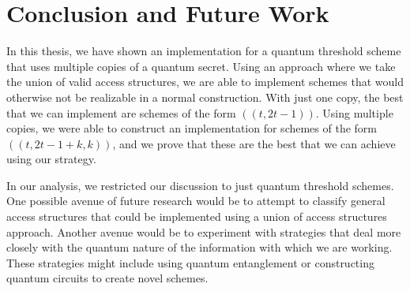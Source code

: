 \chapter{Conclusion and Future Work}
\label{conclusion}

In this thesis, we have shown an implementation for a quantum threshold scheme that uses multiple copies of a quantum secret. Using an approach where we take the union of valid access structures, we are able to implement schemes that would otherwise not be realizable in a normal construction. With just one copy, the best that we can implement are schemes of the form $((t,2t-1))$. Using multiple copies, we were able to construct an implementation for schemes of the form $((t,2t-1+k,k))$, and we prove that these are the best that we can achieve using our strategy.

In our analysis, we restricted our discussion to just quantum threshold schemes. One possible avenue of future research would be to attempt to classify general access structures that could be implemented using a union of access structures approach. Another avenue would be to experiment with strategies that deal more closely with the quantum nature of the information with which we are working. These strategies might include using quantum entanglement or constructing quantum circuits to create novel schemes.